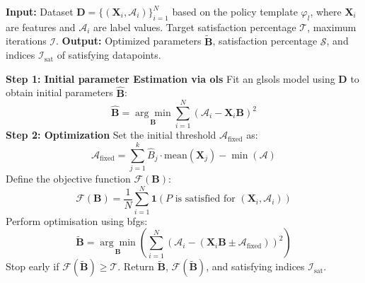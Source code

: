 \begin{algorithm}[htbp]
   \caption{Policy-mining approach}
   
   \begin{algorithmic}[1]
    \State \textbf{Input:} Dataset $\mathcal{\mathbf{D}} = \{(\mathbf{X}_i, \mathcal{A}_i)\}_{i=1}^N$ based on the policy template $\varphi_l$, where $\mathbf{X}_i$ are features and $\mathcal{A}_i$ are label values. Target satisfaction percentage $\mathcal{T}$, maximum iterations $\mathcal{I}$.
    \State \textbf{Output:} Optimized parameters $\tilde{\mathbf{B}}$, satisfaction percentage $\mathcal{S}$, and indices $\mathcal{I}_{\text{sat}}$ of satisfying datapoints.
       
    \Statex 
    \State \textbf{Step 1: Initial parameter Estimation via \gls{ols}}
    \State Fit an gls{ols} model using $\mathcal{\mathbf{D}}$ to obtain initial parameters $\hat{\mathbf{B}}$:
       \[
    \hat{\mathbf{B}} = \underset{\mathbf{B}}{\arg\min} \sum_{i=1}^N \left( \mathcal{A}_i - \mathbf{X}_i \mathbf{B} \right)^2
       \]
     \Statex  
    \State \textbf{Step 2: Optimization}
    \State Set the initial threshold $\mathcal{A}_{\text{fixed}}$ as:
       \[
    \mathcal{A}_{\text{fixed}} = \sum_{j=1}^k \hat{B}_j \cdot \text{mean}(\mathbf{X}_j) - \min(\mathcal{A})
       \]
    \State Define the objective function $\mathcal{F}(\mathbf{B})$:
       \[
    \mathcal{F}(\mathbf{B}) = \frac{1}{N} \sum_{i=1}^N \mathbf{1}\left(P \text{ is satisfied for } (\mathbf{X}_i, \mathcal{A}_i)\right)
       \]
    \State Perform optimisation using  \gls{bfgs}:
       \[
    \tilde{\mathbf{B}} = \underset{\mathbf{B}}{\arg\min} \left(\sum_{i=1}^N \left(\mathcal{A}_i - (\mathbf{X}_i \mathbf{B} \pm \mathcal{A}_{\text{fixed}})\right)^2 \right)
       \]
    Stop early if $\mathcal{F}(\tilde{\mathbf{B}}) \geq \mathcal{T}$.
    \State Return $\tilde{\mathbf{B}}$, $\mathcal{F}(\tilde{\mathbf{B}})$, and satisfying indices $\mathcal{I}_{\text{sat}}$.
    \end{algorithmic}
       \label{alg:compositional_training}
   \end{algorithm}
   
   
   
